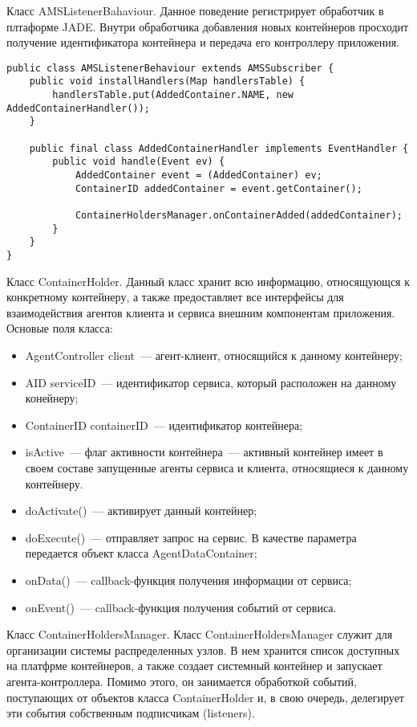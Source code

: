 Класс AMSListenerBahaviour. Данное поведение регистрирует обработчик в плтаформе JADE. Внутри обработчика добавления новых контейнеров просходит получение идентификатора контейнера и передача его контроллеру приложения.
\begin{lstlisting}
public class AMSListenerBehaviour extends AMSSubscriber {
    public void installHandlers(Map handlersTable) {
        handlersTable.put(AddedContainer.NAME, new AddedContainerHandler());
    }

    public final class AddedContainerHandler implements EventHandler {
        public void handle(Event ev) {
            AddedContainer event = (AddedContainer) ev;
            ContainerID addedContainer = event.getContainer();

            ContainerHoldersManager.onContainerAdded(addedContainer);
        }
    }
}
\end{lstlisting}

Класс ContainerHolder. Данный класс хранит всю информацию, относящующся к конкретному контейнеру, а также предоставляет все интерфейсы для взаимодействия агентов клиента и сервиса внешним компонентам приложения. Основые поля класса:

\begin{itemize}
\item AgentController client~--- агент-клиент, относящийся к данному контейнеру;
\item AID serviceID~--- идентификатор сервиса, который расположен на данному конейнеру;
\item ContainerID containerID~--- идентификатор контейнера;
\item isActive~--- флаг активности контейнера~--- активный контейнер имеет в своем составе запущенные агенты сервиса и клиента, относящиеся к данному контейнеру.
\end{itemize}

\begin{itemize}
\item doActivate()~--- активирует данный контейнер;
\item doExecute()~--- отправляет запрос на сервис. В качестве параметра передается объект класса AgentDataContainer;
\item onData()~--- callback-функция получения информации от сервиса;
\item onEvent()~--- callback-функция получения событий от сервиса.
\end{itemize}

Класс ContainerHoldersManager. Класс ContainerHoldersManager служит для организации системы распределенных узлов. В нем хранится список доступных на платфрме контейнеров, а также создает системный контейнер и запускает агента-контроллера. Помимо этого, он занимается обработкой событий, поступающих от объектов класса ContainerHolder и, в свою очередь, делегирует эти события собственным подписчикам (listeners).

